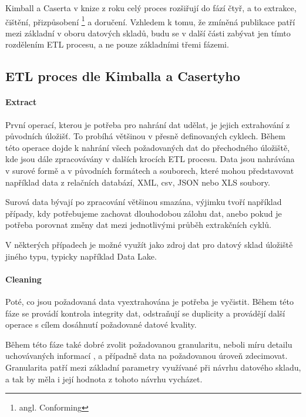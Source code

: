 \documentclass[
  digital,     %
  twoside,     %
  lof,         %
  lot,         %
]{fithesis4}
\begin{document}
Kimball a Caserta v knize  z roku \citeyear{Kimballc2004} celý proces rozšiřují do fází čtyř, a to extrakce, čištění, přizpůsobení \footnote{angl. Conforming}
a doručení. Vzhledem k tomu, že zmíněná publikace patří mezi základní v oboru datových skladů, budu se v další části zabývat jen tímto rozdělením ETL
procesu, a ne pouze základními třemi fázemi. %

\subsection{ETL proces dle Kimballa a Casertyho}
\paragraph{Extract}
První operací, kterou je potřeba pro nahrání dat udělat, je jejich extrahování
z původních úložišť. To probíhá většinou v přesně definovaných cyklech. Během této operace
dojde k nahrání všech požadovaných dat do přechodného úložiště, kde jsou dále
zpracovávány v dalších krocích ETL procesu. Data jsou nahrávána v surové formě a
v původních formátech a souborech, které mohou představovat například data z relačních
databází, XML, csv, JSON nebo XLS soubory.\parencite[s.~18]{Kimballc2004}

Surová data bývají po zpracování většinou smazána, výjimku tvoří například případy,
kdy potřebujeme zachovat dlouhodobou zálohu dat, anebo pokud je potřeba porovnat změny dat mezi
jednotlivými průběh extrakčních cyklů.\parencite[s.~18]{Kimballc2004}

V některých případech je možné využít jako zdroj dat pro datový sklad úložiště jiného
typu, typicky například Data Lake.

\paragraph{Cleaning}
Poté, co jsou požadovaná data vyextrahována je potřeba je vyčistit. Během této fáze
se provádí kontrola integrity dat, odstraňují se duplicity a provádějí další operace s cílem
dosáhnutí požadované datové kvality.\parencite[s.~18-19]{Kimballc2004}

Během této fáze také dobré zvolit požadovanou granularitu, neboli míru detailu
uchovávaných informací \parencite[s.~41]{Inmon2005}, a případně data na požadovanou úroveň
zdecimovat. Granularita patří mezi základní parametry využívané při návrhu datového
skladu, a tak by měla i její hodnota z tohoto návrhu vycházet.\parencite[s.~41]{Inmon2005}
\end{document}
